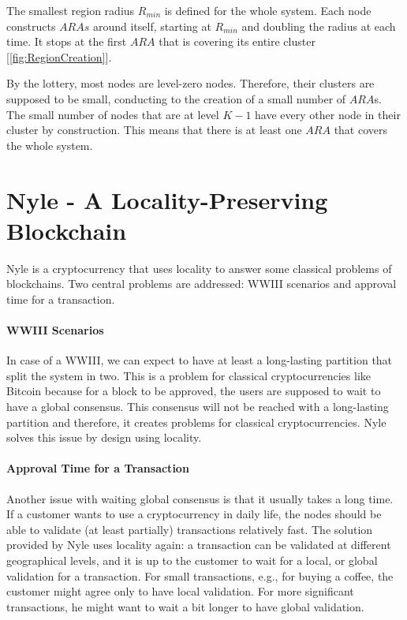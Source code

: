 \documentclass[a4paper,11pt,twoside=semi,openright]{report}
\begin{document}
The smallest region radius $R_{min}$ is defined for the whole system. Each node
constructs $ARAs$ around itself, starting at $R_{min}$ and doubling the
radius at each time. It stops at the first $ARA$ that is covering its entire
cluster [\autoref{fig:RegionCreation}]. 

By the lottery, most nodes are level-zero nodes. Therefore, their clusters are
supposed to be small, conducting to the creation of a small number of $ARA$s.
The small number of nodes that are at level $K-1$ have every other node
in their cluster by construction. This means that there is  at least one
$ARA$ that covers the whole system. 

\section{Nyle - A Locality-Preserving Blockchain}

Nyle is a cryptocurrency that uses locality to answer some classical problems
of blockchains. Two central problems are addressed: WWIII scenarios and approval
time for a transaction.
 
\paragraph{WWIII Scenarios} \label{WWIII} In case of a WWIII, we can expect to
have at least a long-lasting partition that split the system in two. This
is a problem for classical cryptocurrencies like Bitcoin \cite{Nakamoto2009}
because for a block to be approved, the users are supposed to wait to have a
global consensus. This consensus will not be reached with a long-lasting
partition and therefore, it creates problems for classical cryptocurrencies.
Nyle solves this issue by design using locality.

\paragraph{Approval Time for a Transaction} \label{approve_time} Another issue
with waiting global consensus is that it usually takes a long time. If a
customer wants to use a cryptocurrency in daily life, the nodes should be able
to validate (at least partially) transactions relatively fast. The solution
provided by Nyle uses locality again: a transaction can be validated at
different geographical levels, and it is up to the customer to wait for a
local, or global validation for a transaction. For small transactions, e.g.,
for buying a coffee, the customer might agree only to have local validation.
For more significant transactions, he might want to wait a bit longer to have
global validation.
\end{document}
